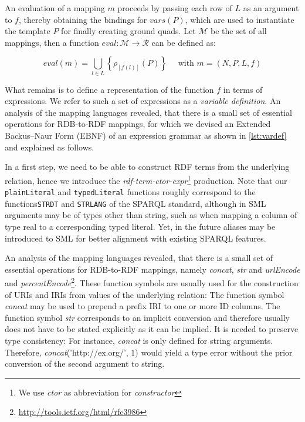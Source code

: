 An evaluation of a mapping $m$ proceeds by
passing each row of $L$ as an argument to $f$,
thereby obtaining the bindings for $vars(P)$,
which are used to instantiate the template $P$
for finally creating ground quads. Let $\mathcal{M}$ be the set of all mappings, then a function $\mathit{eval}: \mathcal{M} \rightarrow \mathcal{R}$ can be defined as:

\[
eval(m) = \bigcup_{l \in L} \left\{ \rho_{[f(l)]}(P) \right\} \quad \text{ with } m = (N,P,L,f)
\]

What remains is to define a representation of the function $f$ in terms of
expressions. We refer to such a set of expressions as a \emph{variable definition}.
An analysis of the mapping languages revealed, that there is a small set
of essential operations for RDB-to-RDF mappings, for which we devised an
Extended Backus–Naur Form (EBNF) of an expression grammar as shown in
\autoref{lst:vardef} and explained as follows.

In a first step, we need to be able to construct RDF terms from the
underlying relation, hence we introduce the
\emph{rdf-term-ctor-expr}\footnote{We use \emph{ctor} as abbreviation for \emph{constructor}} production.
Note that our \texttt{plainLiteral} and \texttt{typedLiteral} functions
roughly correspond to the functions\texttt{STRDT} and \texttt{STRLANG} of the SPARQL standard,
although in SML arguments may be of types other than string, such as when mapping a column of type real to a corresponding typed literal.
Yet, in the future aliases may be introduced to SML for better alignment with existing SPARQL features.

An analysis of the mapping languages revealed, that there is a small set
of essential operations for RDB-to-RDF mappings,
namely \emph{concat}, \emph{str} and \emph{urlEncode} and
\emph{percentEncode}\footnote{\url{http://tools.ietf.org/html/rfc3986}}.
These function symbols are usually used for the construction of URIs and
IRIs from values of the underlying relation: The function symbol
\emph{concat} may be used to prepend a prefix IRI to one or more ID columns.
The function symbol \emph{str} corresponds to an implicit conversion and
therefore usually does not have to be stated explicitly as it can be implied.
It is needed to preserve type consistency:
For instance, \emph{concat} is only defined for string arguments.
Therefore, \emph{concat}('http://ex.org/', 1) would yield a type error without
the prior conversion of the second argument to string.


